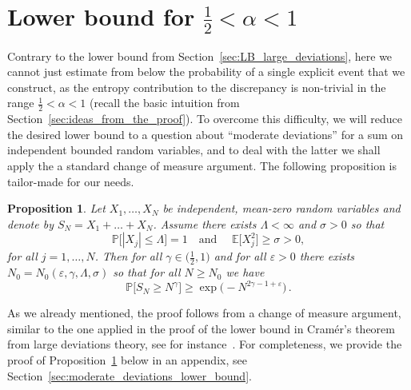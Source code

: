 \documentclass[11pt]{amsart}
\newtheorem{proposition}[theorem]{Proposition}
\theoremstyle{definition}
\theoremstyle{remark}
\numberwithin{equation}{section}
\def\eps{{\varepsilon}}
\def\La{{\Lambda}}
\newcommand{\bP}{\mathbb P}
\newcommand{\bE}{\mathbb E}
\begin{document}
	\section{Lower bound for \texorpdfstring{$\frac{1}{2} < \alpha < 1$}{1/2< alpha < 1}}
	\label{sec:LB_moderate_deviations}
	Contrary to the lower bound from Section~\ref{sec:LB_large_deviations}, here we cannot just estimate from below the probability of a single explicit event that we construct, as the entropy contribution to the discrepancy is non-trivial in the range $\tfrac{1}{2}<\alpha<1$ (recall the basic intuition from Section~\ref{sec:ideas_from_the_proof}). To overcome this difficulty, we will reduce the desired lower bound to a question about ``moderate deviations'' for a sum on independent bounded random variables, and to deal with the latter we shall apply the a standard change of measure argument. The following proposition is tailor-made for our needs.
	\begin{proposition}
		\label{prop:moderate_deviations_lower_bound_bounded_random_variables}
		Let $X_1,\ldots,X_N$ be independent, mean-zero random variables and denote by $S_N = X_1+\ldots+X_N$. Assume there exists $\La<\infty$ and $\sigma>0$ so that
		\begin{equation*}
			\bP\big[|X_j| \le \La\big] = 1 \quad \text{and } \quad\bE\big[X_j^2\big]\ge \sigma>0,
		\end{equation*}
		for all $j=1,\ldots,N$. Then for all $\gamma\in\big(\frac{1}{2},1\big)$ and for all $\eps>0$ there exists $N_0=N_0(\eps,\gamma,\La,\sigma)$ so that for all $N\ge N_0$ we have
		\[
		\bP\Big[S_N \ge N^\gamma\Big] \ge \exp\Big(-N^{2\gamma-1+\eps}\Big) \, .
		\]
	\end{proposition} 
	As we already mentioned, the proof follows from a change of measure argument, similar to the one applied in the proof of the lower bound in Cram\'er's theorem from large deviations theory, see for instance~\cite[Section~2.2]{DemboZeitouniLDP}. For completeness, we provide the proof of Proposition~\ref{prop:moderate_deviations_lower_bound_bounded_random_variables} below in an appendix, see Section~\ref{sec:moderate_deviations_lower_bound}.
\end{document}
